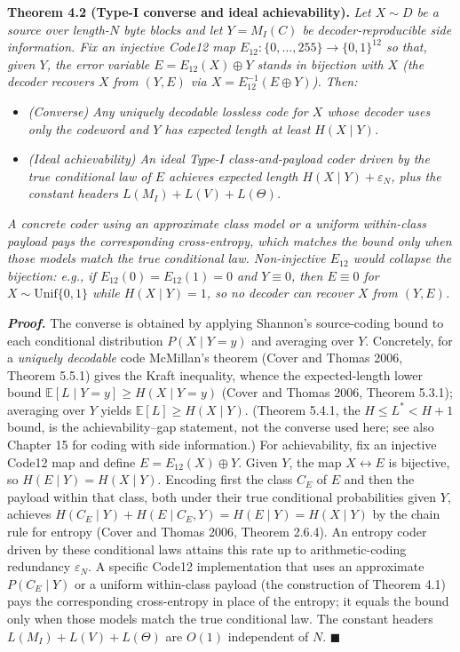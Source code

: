 \documentclass[
]{article}
\begin{document}
\textbf{Theorem 4.2 (Type-I converse and ideal achievability).}
\emph{Let $X \sim D$ be a source over length-$N$ byte blocks and let
$Y = M_I(C)$ be decoder-reproducible side information. Fix an
\emph{injective} Code12 map
$E_{12} : \{0, \ldots, 255\} \to \{0, 1\}^{12}$ so that, given $Y$,
the error variable $E = E_{12}(X) \oplus Y$ stands in bijection with
$X$ (the decoder recovers $X$ from $(Y, E)$ via
$X = E_{12}^{-1}(E \oplus Y)$). Then:}
\begin{itemize}
\item[\textbf{(C)}] \emph{(\emph{Converse}) Any uniquely decodable lossless
code for $X$ whose decoder uses only the codeword and $Y$ has
expected length at least $H(X \mid Y)$.}
\item[\textbf{(A)}] \emph{(\emph{Ideal achievability}) An \emph{ideal}
Type-I class-and-payload coder driven by the true conditional law
of $E$ achieves expected length $H(X \mid Y) + \varepsilon_N$, plus
the constant headers $L(M_I) + L(V) + L(\Theta)$.}
\end{itemize}
\emph{A concrete coder using an approximate class model or a uniform
within-class payload pays the corresponding cross-entropy, which
matches the bound only when those models match the true
conditional law. Non-injective $E_{12}$ would
collapse the bijection: e.g., if $E_{12}(0) = E_{12}(1) = 0$ and
$Y \equiv 0$, then $E \equiv 0$ for $X \sim \mathrm{Unif}\{0, 1\}$
while $H(X \mid Y) = 1$, so no decoder can recover $X$ from $(Y, E)$.}

\emph{\textbf{Proof.}} The converse is obtained by applying Shannon's
source-coding bound to each conditional distribution
$P(X \mid Y = y)$ and averaging over $Y$. Concretely, for a
\emph{uniquely decodable} code McMillan's theorem (Cover and Thomas
2006, Theorem 5.5.1) gives the Kraft inequality, whence the
expected-length lower bound $\mathbb{E}[L \mid Y = y] \geq
H(X \mid Y = y)$ (Cover and Thomas 2006, Theorem 5.3.1); averaging
over $Y$ yields $\mathbb{E}[L] \geq H(X \mid Y)$. (Theorem 5.4.1,
the $H \leq L^\ast < H + 1$ bound, is the achievability--gap
statement, not the converse used here; see also Chapter 15 for
coding with side information.)
For achievability, fix an injective Code12 map and define
$E = E_{12}(X) \oplus Y$. Given $Y$, the map $X \leftrightarrow E$ is
bijective, so $H(E \mid Y) = H(X \mid Y)$. Encoding first the class
$C_E$ of $E$ and then the payload within that class, both under their
true conditional probabilities given $Y$, achieves
$H(C_E \mid Y) + H(E \mid C_E, Y) = H(E \mid Y) = H(X \mid Y)$ by the
chain rule for entropy (Cover and Thomas 2006, Theorem 2.6.4). An entropy coder driven by these conditional laws attains
this rate up to arithmetic-coding redundancy $\varepsilon_N$. A
specific Code12 implementation that uses an approximate $P(C_E \mid Y)$
or a uniform within-class payload (the construction of Theorem 4.1)
pays the corresponding cross-entropy in place of the entropy; it
equals the bound only when those models match the true conditional
law. The constant headers $L(M_I) + L(V) + L(\Theta)$ are $O(1)$
independent of $N$. \hfill$\blacksquare$
\end{document}

